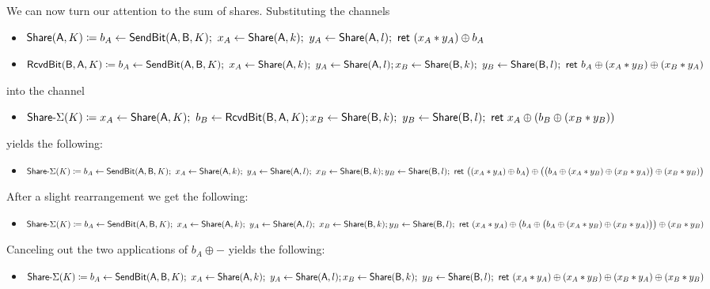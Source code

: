 \begin{itemize}
We can now turn our attention to the sum of shares. Substituting the channels
\begin{itemize}
\item $\mathsf{Share}(\mathsf{A},K) \coloneqq b_A \leftarrow \mathsf{SendBit}(\mathsf{A},\mathsf{B},K); \ x_A \leftarrow \mathsf{Share}(\mathsf{A},k); \ y_A \leftarrow \mathsf{Share}(\mathsf{A},l); \ \mathsf{ret} \ (x_A * y_A) \oplus b_A$
\item $\mathsf{RcvdBit}(\mathsf{B},\mathsf{A},K) \coloneqq b_A \leftarrow \mathsf{SendBit}(\mathsf{A},\mathsf{B},K); \ x_A \leftarrow \mathsf{Share}(\mathsf{A},k); \ y_A \leftarrow \mathsf{Share}(\mathsf{A},l); \\ x_B \leftarrow \mathsf{Share}(\mathsf{B},k); \ y_B \leftarrow \mathsf{Share}(\mathsf{B},l); \ \mathsf{ret} \ b_A \oplus (x_A * y_B) \oplus (x_B * y_A)$
\end{itemize}
into the channel
\begin{itemize}
\item $\mathsf{Share}\textsf{-}\Sigma(K) \coloneqq x_A \leftarrow \mathsf{Share}(\mathsf{A},K); \ b_B \leftarrow \mathsf{RcvdBit}(\mathsf{B},\mathsf{A},K); \\ x_B \leftarrow \mathsf{Share}(\mathsf{B},k); \ y_B \leftarrow \mathsf{Share}(\mathsf{B},l); \ \mathsf{ret} \ x_A \oplus (b_B \oplus (x_B * y_B))$
\end{itemize}
yields the following:
\begin{itemize}
\item $\mathsf{Share}\textsf{-}\Sigma(K) \coloneqq b_A \leftarrow \mathsf{SendBit}(\mathsf{A},\mathsf{B},K); \ x_A \leftarrow \mathsf{Share}(\mathsf{A},k); \ y_A \leftarrow \mathsf{Share}(\mathsf{A},l); \ x_B \leftarrow \mathsf{Share}(\mathsf{B},k); \\ y_B \leftarrow \mathsf{Share}(\mathsf{B},l); \ \mathsf{ret} \ \big((x_A * y_A) \oplus b_A\big) \oplus \big(\big(b_A \oplus (x_A * y_B) \oplus (x_B * y_A)\big) \oplus (x_B * y_B)\big)$
\end{itemize}
After a slight rearrangement we get the following:
\begin{itemize}
\item $\mathsf{Share}\textsf{-}\Sigma(K) \coloneqq b_A \leftarrow \mathsf{SendBit}(\mathsf{A},\mathsf{B},K); \ x_A \leftarrow \mathsf{Share}(\mathsf{A},k); \ y_A \leftarrow \mathsf{Share}(\mathsf{A},l); \ x_B \leftarrow \mathsf{Share}(\mathsf{B},k); \\ y_B \leftarrow \mathsf{Share}(\mathsf{B},l); \ \mathsf{ret} \ (x_A * y_A) \oplus \big(b_A \oplus \big(b_A \oplus (x_A * y_B) \oplus (x_B * y_A)\big)\big) \oplus (x_B * y_B)$
\end{itemize}
Canceling out the two applications of $b_A \oplus -$ yields the following:
\begin{itemize}
\item $\mathsf{Share}\textsf{-}\Sigma(K) \coloneqq b_A \leftarrow \mathsf{SendBit}(\mathsf{A},\mathsf{B},K); \ x_A \leftarrow \mathsf{Share}(\mathsf{A},k); \ y_A \leftarrow \mathsf{Share}(\mathsf{A},l); \\ x_B \leftarrow \mathsf{Share}(\mathsf{B},k); \ y_B \leftarrow \mathsf{Share}(\mathsf{B},l); \ \mathsf{ret} \ (x_A * y_A) \oplus (x_A * y_B) \oplus (x_B * y_A) \oplus (x_B * y_B)$

\end{itemize}
\end{itemize}
